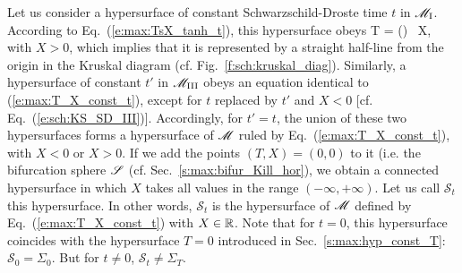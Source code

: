 Let us consider a hypersurface of constant Schwarzschild-Droste time $t$
in $\mathscr{M}_{\rm I}$. According to Eq.~(\ref{e:max:TsX_tanh_t}), this hypersurface
obeys
\be \label{e:max:T_X_const_t}
    T = \tanh\left(\right) \, X,
\ee
with $X>0$,
which implies that it is represented by a straight half-line from the origin
in the Kruskal diagram (cf. Fig.~\ref{f:sch:kruskal_diag}).
Similarly, a hypersurface of constant $t'$
in $\mathscr{M}_{\rm III}$ obeys an equation identical to (\ref{e:max:T_X_const_t}),
except for $t$ replaced by $t'$ and $X<0$ [cf. Eq.~(\ref{e:sch:KS_SD_III})].
Accordingly, for $t'=t$, the union of these two hypersurfaces
forms a hypersurface of $\mathscr{M}$ ruled by Eq.~(\ref{e:max:T_X_const_t}),
with $X<0$ or $X>0$. If we add the points $(T,X)=(0,0)$ to it (i.e. the
bifurcation sphere $\mathscr{S}$ (cf. Sec.~\ref{s:max:bifur_Kill_hor}),
we obtain a connected hypersurface in which $X$ takes all values in
the range $(-\infty,+\infty)$. Let us call $\mathcal{S}_t$ this hypersurface.
In other words, $\mathcal{S}_t$ is the hypersurface of $\mathscr{M}$ defined by
Eq.~(\ref{e:max:T_X_const_t}) with $X\in\mathbb{R}$.
Note that for $t=0$, this hypersurface coincides with the hypersurface
$T=0$ introduced in Sec.~\ref{s:max:hyp_const_T}: $\mathcal{S}_0 = \Sigma_0$.
But for $t\not=0$, $\mathcal{S}_t \not= \Sigma_T$.

